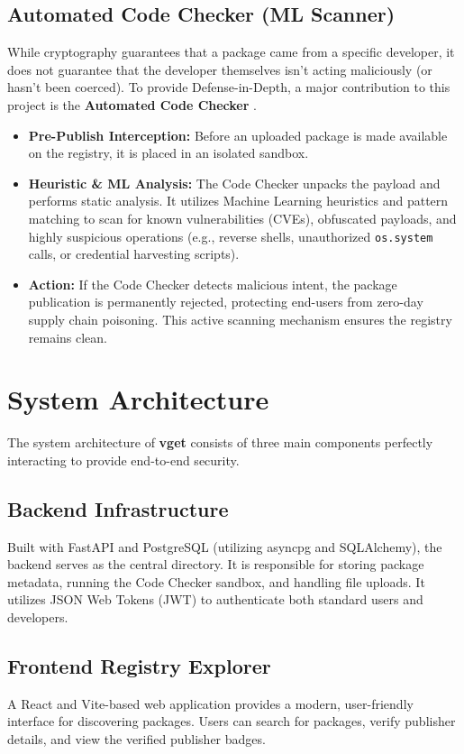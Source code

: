 \documentclass[conference]{IEEEtran}
\begin{document}
\subsection{Automated Code Checker (ML Scanner)}
While cryptography guarantees that a package came from a specific developer, it does not guarantee that the developer themselves isn't acting maliciously (or hasn't been coerced). To provide Defense-in-Depth, a major contribution to this project is the \textbf{Automated Code Checker} \cite{sejfia2022practical, duan2021towards}.
\begin{itemize}
    \item \textbf{Pre-Publish Interception:} Before an uploaded package is made available on the registry, it is placed in an isolated sandbox.
    \item \textbf{Heuristic \& ML Analysis:} The Code Checker unpacks the payload and performs static analysis. It utilizes Machine Learning heuristics and pattern matching to scan for known vulnerabilities (CVEs), obfuscated payloads, and highly suspicious operations (e.g., reverse shells, unauthorized \texttt{os.system} calls, or credential harvesting scripts).
    \item \textbf{Action:} If the Code Checker detects malicious intent, the package publication is permanently rejected, protecting end-users from zero-day supply chain poisoning. This active scanning mechanism ensures the registry remains clean.
\end{itemize}

\section{System Architecture}
The system architecture of \textbf{vget} consists of three main components perfectly interacting to provide end-to-end security.

\subsection{Backend Infrastructure}
Built with FastAPI and PostgreSQL (utilizing asyncpg and SQLAlchemy), the backend serves as the central directory. It is responsible for storing package metadata, running the Code Checker sandbox, and handling file uploads. It utilizes JSON Web Tokens (JWT) to authenticate both standard users and developers.

\subsection{Frontend Registry Explorer}
A React and Vite-based web application provides a modern, user-friendly interface for discovering packages. Users can search for packages, verify publisher details, and view the verified publisher badges.
\end{document}
